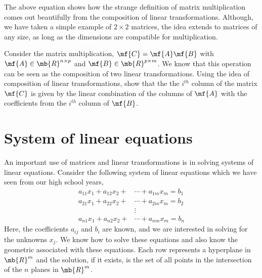 The above equation shows how the strange definition of matrix multiplication comes out beautifully from the composition of linear transformations. Although, we have taken a simple example of $2 \times 2$ matrices, the idea extends to matrices of any size, as long as the dimensions are compatible for multiplication.

\begin{boxedstuff}
    \begin{problem}
        Consider the matrix multiplication, $\mf{C} = \mf{A}\mf{B}$ with $\mf{A} \in \mb{R}^{n \times p}$ and $\mf{B} \in \mb{R}^{p \times m}$. We know that this operation can be seen as the composition of two linear transformations. Using the idea of composition of linear transformations, show that the the $i^{th}$ column of the matrix $\mf{C}$ is given by the linear combination of the columns of $\mf{A}$ with the coefficients from the $i^{th}$ column of $\mf{B}$.
    \end{problem}
\end{boxedstuff}

\section{System of linear equations}\label{sec:ch03-sys-lin-eqn}
An important use of matrices and linear transformations is in solving systems of linear equations. Consider the following system of linear equations which we have seen from our high school years,
\begin{equation}
    \begin{split}
        a_{11}x_1 + a_{12}x_2 + &\cdots + a_{1m}x_m = b_1\\
        a_{21}x_1 + a_{22}x_2 + &\cdots + a_{2m}x_m = b_2\\
        &\vdots\\
        a_{n1}x_1 + a_{n2}x_2 + &\cdots + a_{nm}x_m = b_n
    \end{split}
    \label{eq:ch03-sys-lin-eqn}
\end{equation}
Here, the coefficients $a_{ij}$ and $b_{i}$ are known, and we are interested in solving for the unknowns $x_{j}$. We know how to solve these equations and also know the geometric associated with these equations. Each row represents a hyperplane in $\mb{R}^m$ and the solution, if it exists, is the set of all points in the intersection of the $n$ planes in $\mb{R}^m$.

